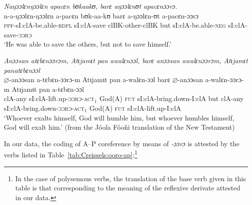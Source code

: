 \documentclass[output=paper]{langscibook}
\begin{document}
  \ea\label{ex:Creissels:24}
    \textit{Naŋɔɔlɛnŋɔɔlɛn apacɛn bʊkaakʊ, barɛ aŋɔɔlɛnʊt apacɛnɔɔrɔ.}\\
    \gll n-a-ŋɔɔlɛn-ŋɔɔlɛn a-pacɛn bʊk-aa-kʊ barɛ a-ŋɔɔlɛn-ʊt a-pacɛn-ɔɔrɔ\\
    \textsc{ppf}-sI:clA-be.able-\textsc{rdpl} sI:clA-save clBK-other-clBK but sI:clA-be.able-\textsc{neg} sI:clA-save-\textsc{ɔɔrɔ}\\
    \glt `He was able to save the others, but not to save himself.'
\z

  \ea\label{ex:Creissels:25}
  
    \textit{Anɔɔsan atɛbɛnɔɔrɔm, Atɩjamɩt pan awalɛnɔɔl,
    barɛ anɔɔsan awalɛnɔɔrɔm, Atɩjamɩt panatɛbɛnɔɔl}\\
    \gll $\varnothing$-anɔɔsan a-tɛbɛn-ɔɔrɔ-m Atɩjamɩt pan a-walɛn-ɔɔl
    barɛ $\varnothing$-anɔɔsan a-walɛn-ɔɔrɔ-m Atɩjamɩt pan a-tɛbɛn-ɔɔl\\
    clA-any sI:clA-lift.up-\textsc{ɔɔrɔ-act$_1$} God(A) \textsc{fut} sI:clA-bring.down-I:clA
    but clA-any sI:clA-bring.down-\textsc{ɔɔrɔ-act$_1$} God(A) \textsc{fut} sI:clA-lift.up-I:clA\\
    \glt `Whoever exalts himself, God will humble him, but whoever humbles himself, God will exalt him.' (from the Jóola Fóoñi translation of the New Testament)
\z

In our data, the coding of A--P coreference by means of \textit{‑ɔɔrɔ} is
attested by the verbs listed in Table~\ref{tab:Creissels:ooro-ap}:\footnote{ In the
  case of polysemous verbs, the translation of the base verb given in this
  table is that corresponding to the meaning of the reflexive derivate attested
  in our data. }
\end{document}

